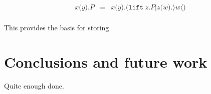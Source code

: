 \documentclass{amsart}
\newcommand{\id}[1]{\texttt{#1}}
\newcommand{\juxtap}{\mathbin{\id{|}}}
\newcommand{\concat}{\mathbin{\id{.}}}
\theoremstyle{definition}
\theoremstyle{remark}
\numberwithin{equation}{subsection}
\newcommand{\lpquote}{\langle}
\newcommand{\rpquote}{\rangle}
\begin{document}
\begin{eqnarray*}
	x \id{(} y \id{)} \concat P 
		& = &
		 x \id{(} y \id{)} \concat \id{(} \id{lift} \; z \concat P \juxtap z \id{(}w \id{)}. \rpquote w \lpquote \id{)} \\
\end{eqnarray*}

This provides the basis for storing

\section{Conclusions and future work}

Quite enough done.





\end{document}
